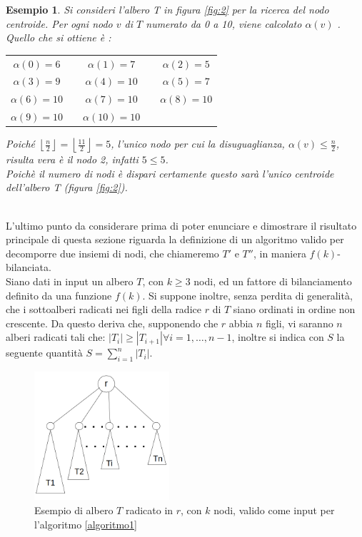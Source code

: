 \newtheorem{esempio}[definizione]{Esempio}
\begin{esempio}
	\label{es1}
Si consideri l'albero T in figura \ref{fig:2} per la ricerca del nodo centroide.
Per ogni nodo $ v $ di $ T $ numerato da 0 a 10,  viene calcolato $\alpha(v)$ . \\
Quello che si ottiene \`e :


\begin{center}
	\begin{tabular}{ c c c c c  }
		$\alpha(0) = 6$ & & $\alpha(1) = 7$ & & $\alpha(2) = 5$ \\ 
		$\alpha(3) = 9$ && $\alpha(4) = 10$ &&  $\alpha(5) =  7$ \\  
		$\alpha(6) = 10$ && $\alpha(7) = 10$ && $\alpha(8) = 10$ \\
		$\alpha(9) = 10$ && $\alpha(10) = 10$ &&
	\end{tabular}
\end{center}

Poich\'e $ \left\lfloor\frac{n}{2} \right\rfloor = \left\lfloor \frac{11}{2} \right\rfloor = 5$, l'unico nodo per cui la disuguaglianza, $\alpha(v)\le\frac{n}{2}$, risulta vera \`e il nodo 2, infatti $5\le 5$.\\
Poich\`e il numero di nodi \`e dispari certamente questo sar\`a l'unico centroide dell'albero T (figura \ref{fig:2}). 
\demo
\end{esempio}\mbox{}\\

L'ultimo punto da considerare prima di poter enunciare e dimostrare il risultato principale di questa sezione riguarda la definizione di un algoritmo valido per decomporre due insiemi di nodi, che chiameremo $ T' $ e $ T'' $, in maniera $ f(k) $-bilanciata.\\
Siano dati in input un albero $ T $, con $ k\ge 3 $ nodi, ed un fattore di bilanciamento definito da una funzione $ f(k) $.
Si suppone inoltre, senza perdita di generalit\`a, che i sottoalberi radicati nei figli della radice $ r $ di $ T $ siano ordinati in ordine non crescente.
Da questo deriva che, supponendo che $ r $ abbia $ n $ figli, vi saranno $ n $ alberi radicati tali che: $ |T_{i}|\ge |T_{i+1}|  \forall {i = 1,\dots, n-1} $, inoltre si indica con $ S $ la seguente quantit\`a $ S=\sum_{i=1}^{n}|T_i| $.
	\begin{figure}[htbp]
	\centering
	\includegraphics[width=5cm]{capitolo3/grafo3}
	\caption{Esempio di albero $ T $ radicato in $ r $, con $ k $ nodi, valido come input per l'algoritmo \ref{algoritmo1}} 
	\label{fig:3}
\end{figure}
\mbox{}\\

